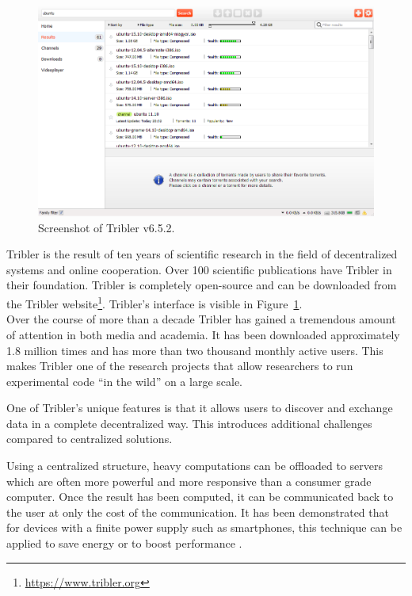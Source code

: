 \begin{figure}[!h]
	\centering
	\includegraphics[width=\linewidth]{introduction/images/tribler_screenshot.png}
	\caption{Screenshot of Tribler v6.5.2.}
	\label{fig:tribler_screenshot}
\end{figure}

Tribler is the result of ten years of scientific research in the field of decentralized systems and online cooperation.
Over 100 scientific publications have Tribler in their foundation.
Tribler is completely open-source and can be downloaded from the Tribler website\footnote{\url{https://www.tribler.org}}.
Tribler's interface is visible in Figure~\ref{fig:tribler_screenshot}.\\
Over the course of more than a decade Tribler has gained a tremendous amount of attention in both media and academia.
It has been downloaded approximately 1.8 million times \cite{github2016releases} and has more than two thousand monthly active users.
This makes Tribler one of the research projects that allow researchers to run experimental code \enquote{in the wild} on a large scale.

One of Tribler's unique features is that it allows users to discover and exchange data in a complete decentralized way.
This introduces additional challenges compared to centralized solutions.

Using a centralized structure, heavy computations can be offloaded to servers which are often more powerful and more responsive than a consumer grade computer.
Once the result has been computed, it can be communicated back to the user at only the cost of the communication. 
It has been demonstrated that for devices with a finite power supply such as smartphones, this technique can be applied to save energy or to boost performance \cite{kumar2010cloud, kemp2010cuckoo}.

